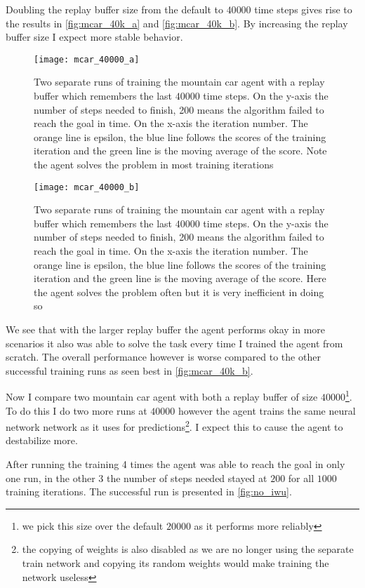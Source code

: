 Doubling the replay buffer size from the default to $40 000$ time steps gives rise to the results in \autoref{fig:mcar_40k_a} and \autoref{fig:mcar_40k_b}. By increasing the replay buffer size I expect more stable behavior. 

\begin{figure}
    \texttt{[image: mcar\_40000\_a]}
    \caption{Two separate runs of training the mountain car agent with a replay buffer which remembers the last $40000$ time steps. On the y-axis the number of steps needed to finish, 200 means the algorithm failed to reach the goal in time. On the x-axis the iteration number. The orange line is epsilon, the blue line follows the scores of the training iteration and the green line is the moving average of the score. Note the agent solves the problem in most training iterations}
    \label{fig:mcar_40k_a}
\end{figure}

\begin{figure}
    \texttt{[image: mcar\_40000\_b]}
    \caption{Two separate runs of training the mountain car agent with a replay buffer which remembers the last $40000$ time steps. On the y-axis the number of steps needed to finish, 200 means the algorithm failed to reach the goal in time. On the x-axis the iteration number. The orange line is epsilon, the blue line follows the scores of the training iteration and the green line is the moving average of the score. Here the agent solves the problem often but it is very inefficient in doing so}
    \label{fig:mcar_40k_b}
\end{figure}

We see that with the larger replay buffer the agent performs okay in more scenarios it also was able to solve the task every time I trained the agent from scratch. The overall performance however is worse compared to the other successful training runs as seen best in \autoref{fig:mcar_40k_b}.

Now I compare two mountain car agent with both a replay buffer of size $40 000$\footnote{we pick this size over the default $20 000$ as it performs more reliably}. To do this I do two more runs at $40 000$ however the agent trains the same neural network network as it uses for predictions\footnote{the copying of weights is also disabled as we are no longer using the separate train network and copying its random weights would make training the network useless}. I expect this to cause the agent to destabilize more.

After running the training 4 times the agent was able to reach the goal in only one run, in the other 3 the number of steps needed stayed at $200$ for all $1000$ training iterations. The successful run is presented in \autoref{fig:no_iwu}.

